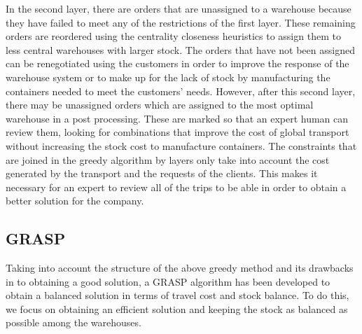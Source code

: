 \documentclass[letterpaper]{article} %
\begin{document}
In the second layer, there are orders that are unassigned to a warehouse because they have failed to meet any of the restrictions of the first layer. These remaining orders are reordered using the centrality closeness heuristics to assign them to less central warehouses with larger stock. The orders that have not been assigned can be renegotiated using the customers in order to improve the response of the warehouse system or to make up for the lack of stock by manufacturing the containers needed to meet the customers' needs. However, after this second layer, there may be unassigned orders which are assigned to the most optimal warehouse in a post processing. These are marked so that an expert human can review them, looking for combinations that improve the cost of global transport without increasing the stock cost to manufacture containers.
The constraints that are joined in the greedy algorithm by layers only take into account the cost generated by the transport and the requests of the clients. This makes it necessary for an expert to review all of the trips to be able in order to obtain a better solution for the company.

\subsection*{GRASP}

Taking into account the structure of the above greedy method and its drawbacks in to obtaining a good solution, a GRASP algorithm has been developed to obtain a balanced solution in terms of travel cost and stock balance. To do this, we focus on obtaining an efficient solution and keeping the stock as balanced as possible among the warehouses.
\end{document}
